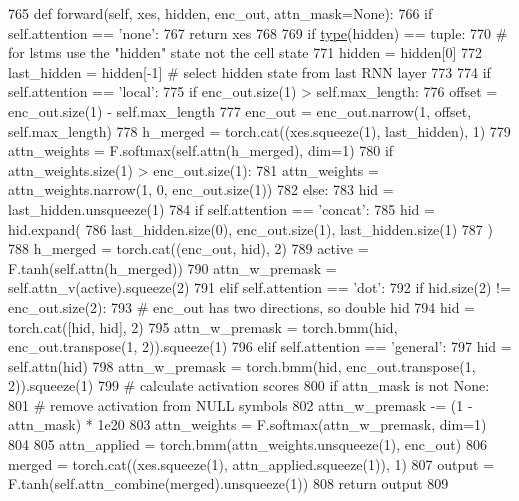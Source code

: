 \begin{DoxyCode}
765     \textcolor{keyword}{def }forward(self, xes, hidden, enc\_out, attn\_mask=None):
766         \textcolor{keywordflow}{if} self.attention == \textcolor{stringliteral}{'none'}:
767             \textcolor{keywordflow}{return} xes
768 
769         \textcolor{keywordflow}{if} \hyperlink{namespaceparlai_1_1agents_1_1tfidf__retriever_1_1build__tfidf_ad5dfae268e23f506da084a9efb72f619}{type}(hidden) == tuple:
770             \textcolor{comment}{# for lstms use the "hidden" state not the cell state}
771             hidden = hidden[0]
772         last\_hidden = hidden[-1]  \textcolor{comment}{# select hidden state from last RNN layer}
773 
774         \textcolor{keywordflow}{if} self.attention == \textcolor{stringliteral}{'local'}:
775             \textcolor{keywordflow}{if} enc\_out.size(1) > self.max\_length:
776                 offset = enc\_out.size(1) - self.max\_length
777                 enc\_out = enc\_out.narrow(1, offset, self.max\_length)
778             h\_merged = torch.cat((xes.squeeze(1), last\_hidden), 1)
779             attn\_weights = F.softmax(self.attn(h\_merged), dim=1)
780             \textcolor{keywordflow}{if} attn\_weights.size(1) > enc\_out.size(1):
781                 attn\_weights = attn\_weights.narrow(1, 0, enc\_out.size(1))
782         \textcolor{keywordflow}{else}:
783             hid = last\_hidden.unsqueeze(1)
784             \textcolor{keywordflow}{if} self.attention == \textcolor{stringliteral}{'concat'}:
785                 hid = hid.expand(
786                     last\_hidden.size(0), enc\_out.size(1), last\_hidden.size(1)
787                 )
788                 h\_merged = torch.cat((enc\_out, hid), 2)
789                 active = F.tanh(self.attn(h\_merged))
790                 attn\_w\_premask = self.attn\_v(active).squeeze(2)
791             \textcolor{keywordflow}{elif} self.attention == \textcolor{stringliteral}{'dot'}:
792                 \textcolor{keywordflow}{if} hid.size(2) != enc\_out.size(2):
793                     \textcolor{comment}{# enc\_out has two directions, so double hid}
794                     hid = torch.cat([hid, hid], 2)
795                 attn\_w\_premask = torch.bmm(hid, enc\_out.transpose(1, 2)).squeeze(1)
796             \textcolor{keywordflow}{elif} self.attention == \textcolor{stringliteral}{'general'}:
797                 hid = self.attn(hid)
798                 attn\_w\_premask = torch.bmm(hid, enc\_out.transpose(1, 2)).squeeze(1)
799             \textcolor{comment}{# calculate activation scores}
800             \textcolor{keywordflow}{if} attn\_mask \textcolor{keywordflow}{is} \textcolor{keywordflow}{not} \textcolor{keywordtype}{None}:
801                 \textcolor{comment}{# remove activation from NULL symbols}
802                 attn\_w\_premask -= (1 - attn\_mask) * 1e20
803             attn\_weights = F.softmax(attn\_w\_premask, dim=1)
804 
805         attn\_applied = torch.bmm(attn\_weights.unsqueeze(1), enc\_out)
806         merged = torch.cat((xes.squeeze(1), attn\_applied.squeeze(1)), 1)
807         output = F.tanh(self.attn\_combine(merged).unsqueeze(1))
808         \textcolor{keywordflow}{return} output
809 \end{DoxyCode}


